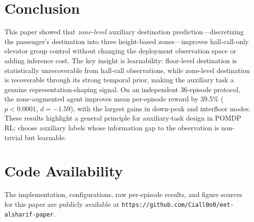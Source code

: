 \documentclass[conference]{IEEEtran}
\begin{document}
\section{Conclusion}
\label{sec:conclusion}

This paper showed that \emph{zone-level} auxiliary destination
prediction---discretizing the passenger's destination into three
height-based zones---improves hall-call-only elevator group control
without changing the deployment observation space or adding inference
cost. The key insight is learnability: floor-level destination is
statistically unrecoverable from hall-call observations, while
zone-level destination is recoverable through its strong temporal
prior, making the auxiliary task a genuine representation-shaping
signal. On an independent 36-episode protocol, the zone-augmented
agent improves mean per-episode reward by 39.5\%
($p < 0.0001$, $d = -1.59$), with the largest gains in
down-peak and interfloor modes. These results highlight a general
principle for auxiliary-task design in POMDP RL: choose auxiliary
labels whose information gap to the observation is non-trivial but
learnable.


\section*{Code Availability}
The implementation, configurations, raw per-episode results, and figure sources for this paper are publicly available at \texttt{https://github.com/Ciall0o0/eet-alsharif-paper}.
\end{document}
